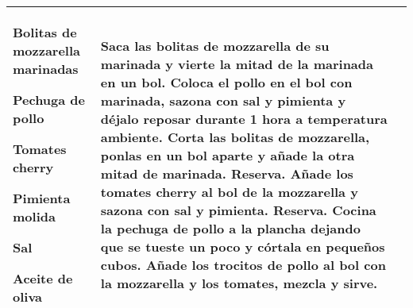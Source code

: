 \documentclass[menu.tex]{subfiles}
\begin{document}
\begin{tabular} {p{3cm} p{4.5cm} p{9cm}}
\begin{compactitem} 
    \begin{scriptsize}
        \item Bolitas de mozzarella marinadas
        \item Pechuga de pollo
        \item Tomates cherry
        \item Pimienta molida
        \item Sal
        \item Aceite de oliva
    \end{scriptsize}
\end{compactitem} &
\vspace{-0.6cm}     
Saca las bolitas de mozzarella de su marinada y vierte la mitad de la marinada en un bol.
Coloca el pollo en el bol con marinada, sazona con sal y pimienta y déjalo reposar durante 1 hora a temperatura ambiente.
Corta las bolitas de mozzarella, ponlas en un bol aparte y añade la otra mitad de marinada. Reserva.
Añade los tomates cherry al bol de la mozzarella y sazona con sal y pimienta. Reserva.
Cocina la pechuga de pollo a la plancha dejando que se tueste un poco y córtala en pequeños cubos.
Añade los trocitos de pollo al bol con la mozzarella y los tomates, mezcla y sirve.\\
\hline


\end{tabular}
\end{document}
